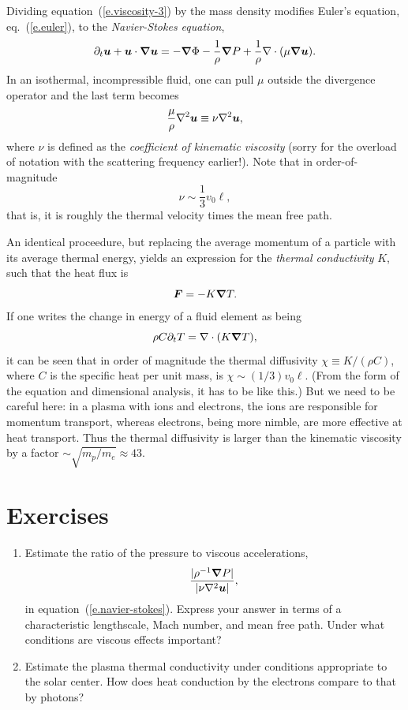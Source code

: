 Dividing equation~(\ref{e.viscosity-3}) by the mass density modifies Euler's equation, eq.~(\ref{e.euler}), to the \emph{Navier-Stokes equation},
\begin{equation}\label{e.navier-stokes}
\partial_{t}\boldsymbol{u} + \boldsymbol{u}\cdot\boldsymbol{\nabla}\boldsymbol{u} = -\boldsymbol{\nabla} \Phi - \frac{1}{\rho}\boldsymbol{\nabla} P + \frac{1}{\rho}\nabla \cdot(\mu \boldsymbol{\nabla}\boldsymbol{u}).
\end{equation}
In an isothermal, incompressible fluid, one can pull $\mu$ outside the divergence operator and the last term becomes
\[ \frac{\mu}{\rho}\nabla^{2}\boldsymbol{u} \equiv \nu \nabla^{2}\boldsymbol{u}, \]
where $\nu$ is defined as the \emph{coefficient of kinematic viscosity} (sorry for the overload of notation with the scattering frequency earlier!). Note that in order-of-magnitude
\[ \nu \sim \frac{1}{3}v_{0}\ell,\]
that is, it is roughly the thermal velocity times the mean free path.

An identical proceedure, but replacing the average momentum of a particle with its average thermal energy, yields an expression for the \emph{thermal conductivity} $K$, such that the heat flux is
\begin{equation}\label{e.flux-equation}
\boldsymbol{F} = -K\boldsymbol{\nabla} T.
\end{equation}
If one writes the change in energy of a fluid element as being 
\[\rho C \partial_{t}T = \nabla \cdot(K\boldsymbol{\nabla} T),\]
 it can be seen that in order of magnitude the thermal diffusivity $\chi \equiv K/(\rho C)$, where $C$ is the specific heat per unit mass, is $\chi \sim (1/3) v_{0} \ell$.  (From the form of the equation and dimensional analysis, it has to be like this.)  But we need to be careful here: in a plasma with ions and electrons, the ions are responsible for momentum transport, whereas electrons, being more nimble, are more effective at heat transport.  Thus the thermal diffusivity is larger than the kinematic viscosity by a factor $\sim \sqrt{m_{p}/m_{e}}\approx 43$.

\section{Exercises}\label{s.plasma-exercises}
\begin{enumerate}

\item Estimate the ratio of the pressure to viscous accelerations,
\[ \frac{|\rho^{-1}\boldsymbol{\nabla} P|}{|\nu\nabla^{2}\boldsymbol{u}|} ,\]
in equation~(\ref{e.navier-stokes}).  Express your answer in terms of a characteristic lengthscale, Mach number, and mean free path.  Under what conditions are viscous effects important?

\item Estimate the plasma thermal conductivity under conditions appropriate to the solar center. How does heat conduction by the electrons compare to that by photons?

\end{enumerate}
